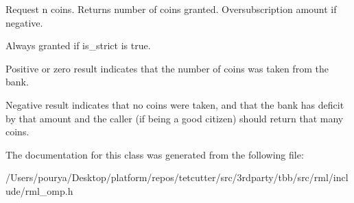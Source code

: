Request n coins. Returns number of coins granted. Oversubscription amount if negative. 

Always granted if is\+\_\+strict is true.
\begin{DoxyItemize}
\item Positive or zero result indicates that the number of coins was taken from the bank.
\item Negative result indicates that no coins were taken, and that the bank has deficit by that amount and the caller (if being a good citizen) should return that many coins. 
\end{DoxyItemize}

The documentation for this class was generated from the following file\+:\begin{DoxyCompactItemize}
\item 
/\+Users/pourya/\+Desktop/platform/repos/tetcutter/src/3rdparty/tbb/src/rml/include/rml\+\_\+omp.\+h\end{DoxyCompactItemize}
